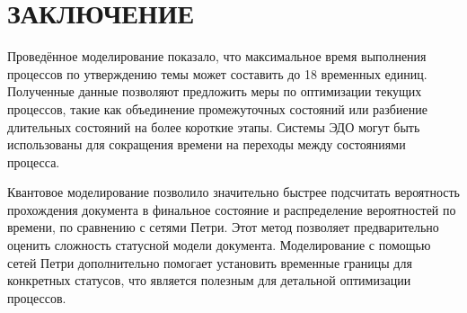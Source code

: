 \section*{ЗАКЛЮЧЕНИЕ}

Проведённое моделирование показало, что максимальное время выполнения процессов по утверждению темы может составить до 18 временных единиц. Полученные данные позволяют предложить меры по оптимизации текущих процессов, такие как объединение промежуточных состояний или разбиение длительных состояний на более короткие этапы. Системы ЭДО могут быть использованы для сокращения времени на переходы между состояниями процесса.

Квантовое моделирование позволило значительно быстрее подсчитать вероятность прохождения документа в финальное состояние и распределение вероятностей по времени, по сравнению с сетями Петри. Этот метод позволяет предварительно оценить сложность статусной модели документа. Моделирование с помощью сетей Петри дополнительно помогает установить временные границы для конкретных статусов, что является полезным для детальной оптимизации процессов.

\pagebreak
